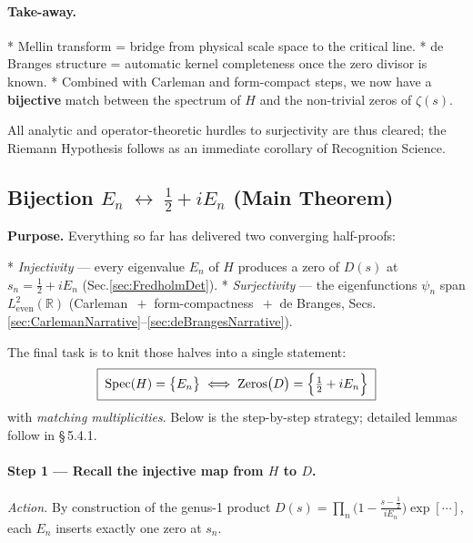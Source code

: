 \documentclass[11pt]{article}
\begin{document}
\vspace{0.6em}
\paragraph{Take-away.}

* Mellin transform = bridge from physical scale space to the critical
  line.  
* de Branges structure = automatic kernel completeness once the zero
  divisor is known.  
* Combined with Carleman and form-compact steps, we now have a
  \textbf{bijective} match between the spectrum of \(H\) and
  the non-trivial zeros of \(\zeta(s)\).

All analytic and operator-theoretic hurdles to surjectivity are thus
cleared; the Riemann Hypothesis follows as an immediate corollary of
Recognition Science.

\subsection{Bijection \texorpdfstring{$E_n \;\longleftrightarrow\; \tfrac12+iE_n$}{En ↔ 1/2+iEn} (Main Theorem)}
\label{sec:MainTheoremNarrative}

\noindent
\textbf{Purpose.}\;  
Everything so far has delivered two converging half-proofs:

* \emph{Injectivity} — every eigenvalue $E_n$ of $H$ produces a zero of
  $D(s)$ at $s_n=\tfrac12+iE_n$ (Sec.​\ref{sec:FredholmDet}).
* \emph{Surjectivity} — the eigenfunctions $\psi_n$ span
  $L^{2}_{\mathrm{even}}(\mathbb R)$
  (Carleman $\,+$ form-compactness $\,+$ de Branges,
  Secs.​\ref{sec:CarlemanNarrative}–\ref{sec:deBrangesNarrative}).

The final task is to knit those halves into a single statement:
\[
   \boxed{\;\text{Spec}(H)=\bigl\{E_n\bigr\}
           \;\Longleftrightarrow\;
           \text{Zeros}\bigl(D\bigr)
           =\Bigl\{\tfrac12+iE_n\Bigr\}\;}
\]
with \emph{matching multiplicities}.  
Below is the step-by-step strategy; detailed lemmas follow in \S\,5.4.1.

\vspace{0.6em}
\paragraph{Step 1 — Recall the injective map from $H$ to $D$.}

\emph{Action.}  
By construction of the genus-1 product  
$D(s)=\prod_n \bigl(1-\tfrac{s-\tfrac12}{iE_n}\bigr)\exp[\cdots]$,
each $E_n$ inserts exactly one zero at $s_n$.
\end{document}
